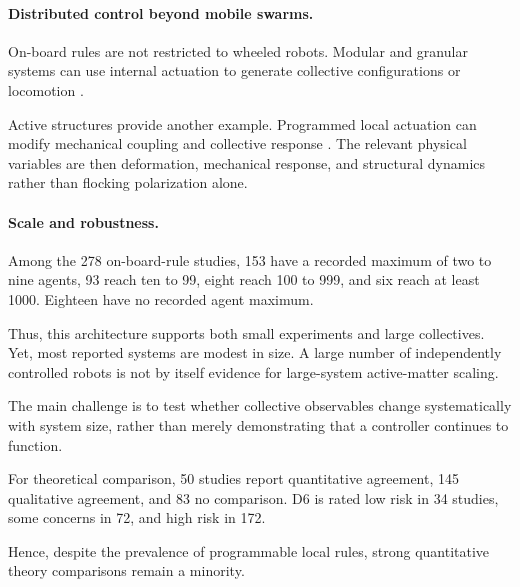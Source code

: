 \paragraph*{Distributed control beyond mobile swarms.}

On-board rules are not restricted to wheeled robots.
Modular and granular systems can use internal
actuation to generate collective configurations
or locomotion
\cite{Li2018supersmarticlealo,Bhamla2021collectivetransport,Vardhan2022glidersinshapecha,Ma2024smarticle20desig,Yang2024selfamputatingand,Hu2026diatominspired1di,Zhang2026anisotropicshapesh,Li2019particleroboticsba,Oliveri2021continuouslearning,Drew2021acousticcommunicati,Savoie2019arobotmadeofrobo,Chvykov2020lowrattlingapred,Li2020programmingactiveg}.

Active structures provide another example.
Programmed local actuation can modify
mechanical coupling and collective response
\cite{Brandenbourger2019nonreciprocalrobot,Brandenbourger2021limitcyclesturnac,Binysh2026moreislessinunpe,Du2026metamaterialsthatl,Coulais2025activemetamaterials,Chen2020selfsensingmetamat}.
The relevant physical variables are then
deformation, mechanical response,
and structural dynamics rather than
flocking polarization alone.

\paragraph*{Scale and robustness.}

Among the 278 on-board-rule studies,
153 have a recorded maximum of two
to nine agents, 93 reach ten to 99,
eight reach 100 to 999, and six
reach at least 1000. Eighteen
have no recorded agent maximum.

Thus, this architecture supports
both small experiments and large
collectives. Yet, most reported
systems are modest in size.
A large number of independently
controlled robots is not by itself
evidence for large-system
active-matter scaling.

The main challenge is to test
whether collective observables
change systematically with
system size, rather than merely
demonstrating that a controller
continues to function.

For theoretical comparison,
50 studies report quantitative
agreement, 145 qualitative agreement,
and 83 no comparison. D6 is rated
low risk in 34 studies,
some concerns in 72,
and high risk in 172.

Hence, despite the prevalence
of programmable local rules,
strong quantitative theory
comparisons remain a minority.


